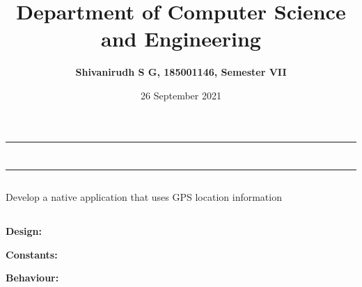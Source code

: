 \documentclass[12pt,letterpaper]{article}
\title{\textbf{Department of Computer Science and Engineering}}
\author{\textbf{Shivanirudh S G, 185001146, Semester VII }}
\date{26 September 2021}
\begin{document}
\maketitle
\hrule
\section*{}
\hrule 
\bigskip\bigskip

\subsection*{}

\subsection*{}
\begin{flushleft}
Develop a native application that uses GPS location information    
\end{flushleft}

\subsection*{}
\subsubsection*{}
\textbf{Design:}
\begin{flushleft}

\end{flushleft}

\textbf{Constants:}
\begin{flushleft}

\end{flushleft}
\begin{flushleft}

\end{flushleft}

\textbf{Behaviour:}
\begin{flushleft}

\end{flushleft}
\begin{flushleft}

\end{flushleft}
\end{document}
